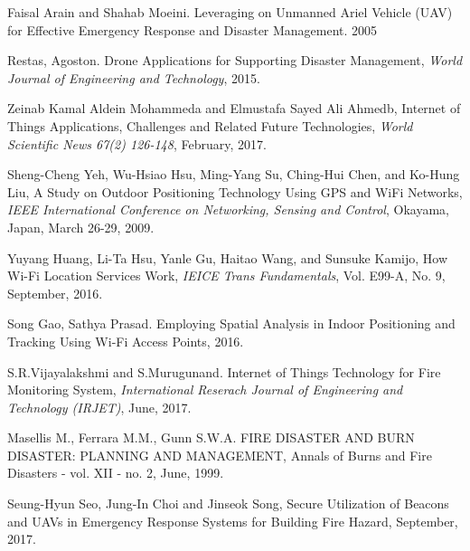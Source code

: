 \documentclass[twocolumn,10pt]{asme2ej}
\begin{document}
	\begin{thebibliography}{99}
		Faisal Arain and Shahab Moeini. Leveraging on Unmanned Ariel Vehicle (UAV) for Effective Emergency Response and Disaster Management. 2005
		
		Restas, Agoston. Drone Applications for Supporting Disaster Management, \textit{World Journal of Engineering and Technology}, 2015.
	
		Zeinab Kamal Aldein Mohammeda and Elmustafa Sayed Ali Ahmedb, Internet of Things Applications, Challenges and Related Future Technologies, \textit{World Scientific News 67(2) 126-148}, February, 2017.
		
		Sheng-Cheng Yeh, Wu-Hsiao Hsu, Ming-Yang Su, Ching-Hui Chen, and Ko-Hung Liu, A Study on Outdoor Positioning Technology Using GPS and WiFi Networks, \textit{IEEE International Conference on Networking, Sensing and Control}, Okayama, Japan, March 26-29, 2009.
				
		Yuyang Huang, Li-Ta Hsu, Yanle Gu, Haitao Wang, and Sunsuke Kamijo, How Wi-Fi Location Services Work, \textit{IEICE Trans Fundamentals}, Vol. E99-A, No. 9, September, 2016.
		
		Song Gao, Sathya Prasad. Employing Spatial Analysis in Indoor Positioning and Tracking Using Wi-Fi Access Points, 2016.
		
		S.R.Vijayalakshmi and S.Murugunand. Internet of Things Technology for Fire Monitoring System, \textit{International Reserach Journal of Engineering and Technology (IRJET)}, June, 2017.
		
		Masellis M., Ferrara M.M., Gunn S.W.A. FIRE DISASTER AND BURN DISASTER: PLANNING AND MANAGEMENT, Annals of Burns and Fire Disasters - vol. XII - no. 2, June, 1999.
		
		Seung-Hyun Seo, Jung-In Choi and Jinseok Song, Secure Utilization of Beacons and UAVs in Emergency Response Systems for Building Fire Hazard, September, 2017.
		
		
	\end{thebibliography}
	
\end{document}
